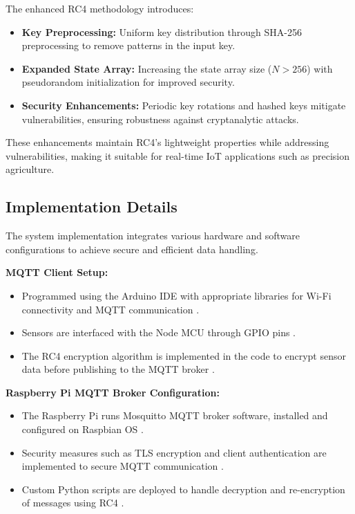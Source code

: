 \documentclass[journal]{Definitions/mdpi}
\begin{document}
\noindent The enhanced RC4 methodology introduces:
\begin{itemize}
    \item \textbf{Key Preprocessing:} Uniform key distribution through SHA-256 preprocessing to remove patterns in the input key.
    \item \textbf{Expanded State Array:} Increasing the state array size (\( N > 256 \)) with pseudorandom initialization for improved security.
    \item \textbf{Security Enhancements:} Periodic key rotations and hashed keys mitigate vulnerabilities, ensuring robustness against cryptanalytic attacks.
\end{itemize}

These enhancements maintain RC4's lightweight properties while addressing vulnerabilities, making it suitable for real-time IoT applications such as precision agriculture.

\subsection{Implementation Details}

The system implementation integrates various hardware and software configurations to achieve secure and efficient data handling.

\textbf{MQTT Client Setup:}
\begin{itemize}
    \item Programmed using the Arduino IDE with appropriate libraries for Wi-Fi connectivity and MQTT communication \cite{ref-standards2}.
    \item Sensors are interfaced with the Node MCU through GPIO pins \cite{ref-mdpi1}.
    \item The RC4 encryption algorithm is implemented in the code to encrypt sensor data before publishing to the MQTT broker \cite{ref-journal2}.
\end{itemize}

\textbf{Raspberry Pi MQTT Broker Configuration:}
\begin{itemize}
    \item The Raspberry Pi runs Mosquitto MQTT broker software, installed and configured on Raspbian OS \cite{ref-conference2}.
    \item Security measures such as TLS encryption and client authentication are implemented to secure MQTT communication \cite{ref-standards2}.
    \item Custom Python scripts are deployed to handle decryption and re-encryption of messages using RC4 \cite{ref-journal2}.
\end{itemize}
\end{document}
